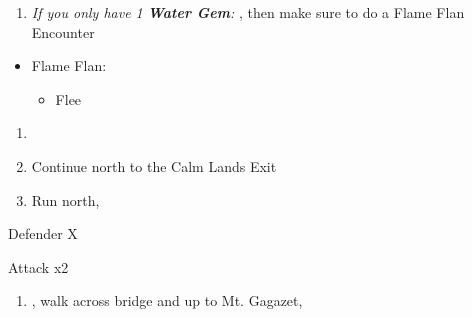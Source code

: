 \begin{enumerate}[resume]
  \item \textit{If you only have 1 \textbf{Water Gem}:} \formation{\tidus}{\auron}{\yuna}, then make sure to do a Flame Flan Encounter
\end{enumerate}
\begin{encounters}
\begin{itemize}
\item Flame Flan:
\begin{itemize}
\kimahrif Steal
\item Flee
\end{itemize}
\end{itemize}
\end{encounters}
\begin{enumerate}[resume]
  \item \formation{\tidus}{\kimahri}{\auron}
  \item Continue north to the Calm Lands Exit
  \item Run north, \sd
\end{enumerate}
\begin{battle}[64000]{Defender X}
  \begin{itemize}
    \switch{\tidus}{\yuna}
    \summon{\bahamut}
    \bahamutf Attack x2
  \end{itemize}
\end{battle}
\begin{enumerate}[resume]
  \item \sd, walk across bridge and up to Mt. Gagazet, \sd
\end{enumerate}
